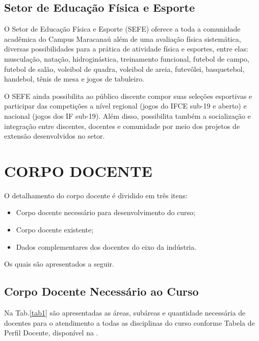 \documentclass{paper}
\begin{document}
\subsection{Setor de Educação Física e Esporte}

O Setor de Educação Física e Esporte (SEFE) oferece a toda a comunidade acadêmica do Campus Maracanaú além de uma avaliação física sistemática, diversas possibilidades para a prática de atividade física e esportes, entre elas: musculação, natação, hidroginástica, treinamento funcional, futebol de campo, futebol de salão, voleibol de quadra, voleibol de areia, futevôlei, basquetebol, handebol, tênis de mesa e jogos de tabuleiro.

O SEFE ainda possibilita ao público discente compor suas seleções esportivas e participar das competições a nível regional (jogos do IFCE sub-19 e aberto) e nacional (jogos dos IF sub-19). Além disso, possibilita também a socialização e integração entre discentes, docentes e comunidade por meio dos projetos de extensão desenvolvidos no setor.


\clearpage
\section{CORPO DOCENTE}\label{CORPODOCENTE}

O detalhamento do corpo docente é dividido em três itens:
\begin{itemize}
\item Corpo docente necessário para desenvolvimento do curso;
\item Corpo docente existente;
\item Dados complementares dos docentes do eixo da indústria.
\end{itemize}

Os quais são apresentados a seguir.

\subsection{Corpo Docente Necessário ao Curso}

Na Tab.\ref{tab1} são apresentadas as áreas, subáreas e quantidade necessária de docentes para o atendimento a todas as disciplinas do curso conforme Tabela de Perfil Docente, disponível na .
\end{document}
